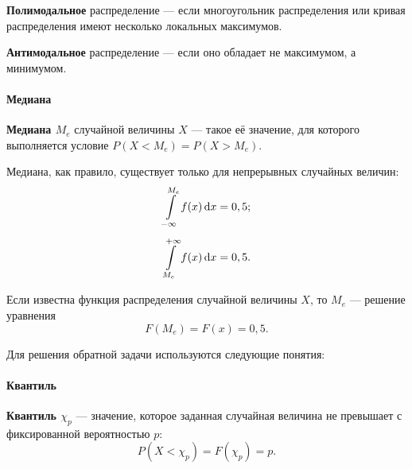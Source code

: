 \documentclass[a4paper]{article}
\newcommand{\key}[1]{{\color{Medium}\bfseries #1}}
\begin{document}
                    \key{Полимодальное} распределение --- если многоугольник распределения или кривая распределения имеют несколько локальных максимумов.
                        
                    \key{Антимодальное} распределение --- если оно обладает не максимумом, а минимумом.

                \paragraph{Медиана}

                    \key{Медиана \boldmath$M_e$} случайной величины $X$ --- такое её значение, для которого выполняется условие $P(X < M_e) = P(X > M_e)$.
                    
                    Медиана, как правило, существует только для непрерывных случайных величин:
                    \begin{equation*}
                        \begin{aligned}
                            \int\limits_{-\infty}^{M_e} f(x) \dif x & = 0,5 ; \\[1.0ex]
                            \int\limits_{M_e}^{+\infty} f(x) \dif x & = 0,5 .
                        \end{aligned}
                    \end{equation*}

                    Если известна функция распределения случайной величины $X$, то $M_e$ --- решение уравнения
                    \begin{equation*}
                        F(M_e) = F(x) = 0,5 .
                    \end{equation*}

                Для решения обратной задачи используются следующие понятия:

                \paragraph{Квантиль}

                    \key{Квантиль \boldmath$\chi_p$} --- значение, которое заданная случайная величина не превышает с фиксированной вероятностью $p$:
                    \begin{equation*}
                        P(X < \chi_p) = F(\chi_p) = p .
                    \end{equation*}
                    
\end{document}
